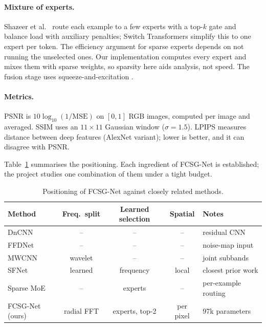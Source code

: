 \documentclass[12pt,a4paper,oneside]{NITR}
\newcommand{\fcsg}{FCSG-Net}
\begin{document}
\paragraph{Mixture of experts.} Shazeer et al.\ \cite{shazeer2017moe} route
each example to a few experts with a top-$k$ gate and balance load with
auxiliary penalties; Switch Transformers \cite{fedus2022switch} simplify this
to one expert per token. The efficiency argument for sparse experts depends on
not running the unselected ones. Our implementation computes every expert
and mixes them with sparse weights, so sparsity here aids analysis, not
speed. The fusion stage uses squeeze-and-excitation \cite{hu2018se}.

\paragraph{Metrics.} PSNR is $10\log_{10}(1/\mathrm{MSE})$ on $[0,1]$ RGB
images, computed per image and averaged. SSIM \cite{wang2004ssim} uses an
$11\times11$ Gaussian window ($\sigma=1.5$). LPIPS \cite{zhang2018lpips}
measures distance between deep features (AlexNet variant); lower is better,
and it can disagree with PSNR.

Table~\ref{tab:gap} summarises the positioning. Each ingredient of \fcsg{} is
established; the project studies one combination of them under a tight
budget.

\begin{table}[htbp]
	\centering
	\caption{Positioning of \fcsg{} against closely related methods.}
	\label{tab:gap}
	\small
	\begin{tabular}{@{}lcccl@{}}
		\toprule
		Method & Freq.\ split & Learned selection & Spatial & Notes \\
		\midrule
		DnCNN \cite{zhang2017dncnn}      & --         & --              & --        & residual CNN \\
		FFDNet \cite{zhang2018ffdnet}    & --         & --              & --        & noise-map input \\
		MWCNN \cite{liu2018mwcnn}        & wavelet    & --              & --        & joint subbands \\
		SFNet \cite{cui2023sfnet}        & learned    & frequency       & local     & closest prior work \\
		Sparse MoE \cite{shazeer2017moe} & --         & experts         & --        & per-example routing \\
		\fcsg{} (ours)                   & radial FFT & experts, top-2  & per pixel & 97k parameters \\
		\bottomrule
	\end{tabular}
\end{table}
\end{document}
